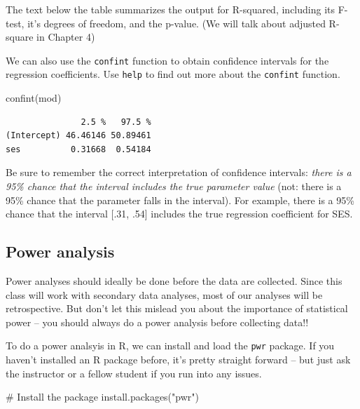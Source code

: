 \documentclass[
  letterpaper,
  DIV=11,
  numbers=noendperiod]{scrreprt}
\newenvironment{Shaded}{\begin{snugshade}}{\end{snugshade}}
\newcommand{\CommentTok}[1]{\textcolor[rgb]{0.37,0.37,0.37}{#1}}
\newcommand{\FunctionTok}[1]{\textcolor[rgb]{0.28,0.35,0.67}{#1}}
\newcommand{\NormalTok}[1]{\textcolor[rgb]{0.00,0.23,0.31}{#1}}
\newcommand{\StringTok}[1]{\textcolor[rgb]{0.13,0.47,0.30}{#1}}
\begin{document}
The text below the table summarizes the output for R-squared, including
its F-test, it's degrees of freedom, and the p-value. (We will talk
about adjusted R-square in Chapter 4)

We can also use the \texttt{confint} function to obtain confidence
intervals for the regression coefficients. Use \texttt{help} to find out
more about the \texttt{confint} function.

\begin{Shaded}
\begin{Highlighting}[]
\FunctionTok{confint}\NormalTok{(mod)}
\end{Highlighting}
\end{Shaded}

\begin{verbatim}
               2.5 %   97.5 %
(Intercept) 46.46146 50.89461
ses          0.31668  0.54184
\end{verbatim}

Be sure to remember the correct interpretation of confidence intervals:
\emph{there is a 95\% chance that the interval includes the true
parameter value} (not: there is a 95\% chance that the parameter falls
in the interval). For example, there is a 95\% chance that the interval
{[}.31, .54{]} includes the true regression coefficient for SES.

\hypertarget{power-analysis}{%
\subsection{Power analysis}\label{power-analysis}}

Power analyses should ideally be done before the data are collected.
Since this class will work with secondary data analyses, most of our
analyses will be retrospective. But don't let this mislead you about the
importance of statistical power -- you should always do a power analysis
before collecting data!!

To do a power analsyis in R, we can install and load the \texttt{pwr}
package. If you haven't installed an R package before, it's pretty
straight forward -- but just ask the instructor or a fellow student if
you run into any issues.

\begin{Shaded}
\begin{Highlighting}[]
\CommentTok{\# Install the package }
\FunctionTok{install.packages}\NormalTok{(}\StringTok{"pwr"}\NormalTok{)}
\end{Highlighting}
\end{Shaded}
\end{document}
